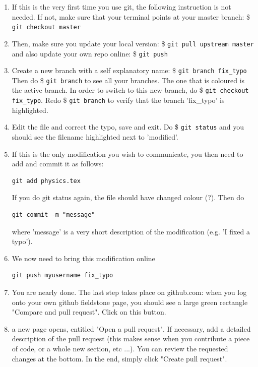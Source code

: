 \begin{enumerate}
\item
If this is the very first time you use git, the following instruction is not needed. If not, 
make sure that your terminal points at your master branch:
\$ \verb"git checkout master"

\item
Then, make sure you update your local version:
\$ \verb"git pull upstream master" 
and also update your own repo online:
\$ \verb"git push"

\item
Create a new branch with a self explanatory name:
\$ \verb"git branch fix_typo"
Then do \$ \verb"git branch" to see all your branches. The one that is coloured is 
the active branch. In order to switch to this new branch, do 
\$ \verb"git checkout fix_typo". Redo \$ \verb"git branch" to verify that 
the branch 'fix\_typo' is highlighted.


\item
Edit the file and correct the typo, save and exit. 
Do \$ \verb"git status" and you should see the filename highlighted next to 'modified'. 

\item If this is the only modification you wish to communicate, you then need to add and commit 
it as follows:
\begin{verbatim}
git add physics.tex
\end{verbatim}
If you do git status again, the file should have changed colour (?). 
Then do
\begin{verbatim}
git commit -m "message"
\end{verbatim}
where 'message' is a very short description of the modification (e.g. 'I fixed a typo').

\item We now need to bring this modification online 
\begin{verbatim}
git push myusername fix_typo
\end{verbatim}

\item You are nearly done. The last step takes place on github.com: when you log onto 
your own github fieldstone page, you should see a large green rectangle "Compare and pull request".
Click on this button.

\item a new page opens, entitled "Open a pull request". If necessary, add a detailed description of 
the pull request (this makes sense when you contribute a piece of code, or a whole new section, etc ...).
You can review the requested changes at the bottom. In the end, simply click "Create pull request".


\end{enumerate}
